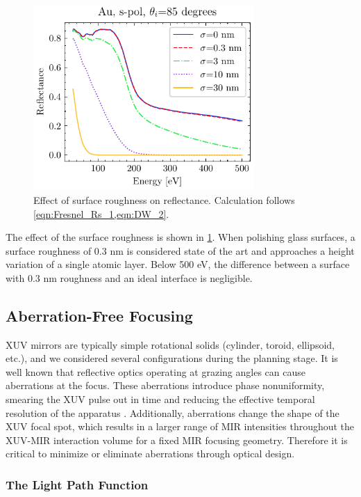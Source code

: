 \begin{figure}
	\centering
	\includegraphics[width=0.75\textwidth]{figures/chap2/R_vs_roughness.pdf}
	\caption{Effect of surface roughness on reflectance. Calculation follows \cref{eqn:Fresnel_Rs_1,eqn:DW_2}.}
	\label{fig:R_vs_roughness}
\end{figure}

The effect of the surface roughness is shown in \cref{fig:R_vs_roughness}. When polishing glass surfaces, a surface roughness of 0.3 nm is considered state of the art and approaches a height variation of a single atomic layer. Below 500 eV, the difference between a surface with 0.3 nm roughness and an ideal interface is negligible. 

\subsection{Aberration-Free Focusing}

XUV mirrors are typically simple rotational solids (cylinder, toroid, ellipsoid, etc.), and we considered several configurations during the planning stage. It is well known that reflective optics operating at grazing angles can cause aberrations at the focus. These aberrations introduce phase nonuniformity, smearing the XUV pulse out in time and reducing the effective temporal resolution of the apparatus \cite{bourassin-bouchetHowFocusAttosecond2013}. Additionally, aberrations change the shape of the XUV focal spot, which results in a larger range of MIR intensities throughout the XUV-MIR interaction volume for a fixed MIR focusing geometry. Therefore it is critical to minimize or eliminate aberrations through optical design.

\subsubsection{The Light Path Function}

